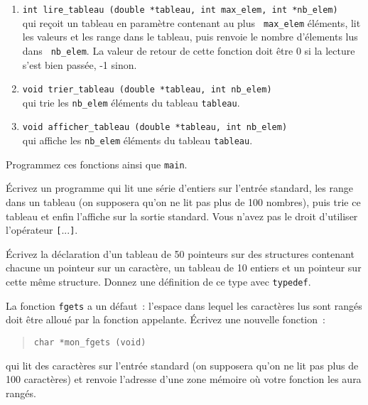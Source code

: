 \begin {enumerate}
    \item \verb|int lire_tableau (double *tableau, int max_elem, int *nb_elem)| \\
	qui reçoit un tableau en paramètre contenant au plus {\tt
	max\_elem} éléments, lit les valeurs et les range dans le
	tableau, puis renvoie le nombre d'élements lus dans {\tt
	nb\_elem}.  La valeur de retour de cette fonction doit être 0 si
	la lecture s'est bien passée, -1 sinon.


    \item \verb|void trier_tableau (double *tableau, int nb_elem)| \\
	qui trie les {\tt nb\_elem} éléments du tableau {\tt tableau}.

    \item \verb|void afficher_tableau (double *tableau, int nb_elem)| \\
	qui affiche les {\tt nb\_elem} éléments du tableau {\tt tableau}.

\end {enumerate}

Programmez ces fonctions ainsi que {\tt main}.


\question

Écrivez un programme qui lit une série d'entiers sur l'entrée
standard, les range dans un tableau (on supposera qu'on ne lit pas plus
de 100 nombres), puis trie ce tableau et enfin l'affiche sur la sortie
standard. Vous n'avez pas le droit d'utiliser l'opérateur {\tt[}...{\tt]}.



\question

Écrivez la déclaration d'un tableau de 50 pointeurs sur des structures
contenant chacune un pointeur sur un caractère, un tableau de 10
entiers et un pointeur sur cette même structure. Donnez une définition
de ce type avec {\tt typedef}.


\question

La fonction {\tt fgets} a un défaut~: l'espace dans lequel les caractères
lus sont rangés doit être alloué par la fonction appelante. Écrivez
une nouvelle fonction~:

\begin {quote}
    \verb|char *mon_fgets (void)|
\end {quote}

qui lit des caractères sur l'entrée standard
(on supposera qu'on ne lit pas plus de 100
caractères) et renvoie l'adresse d'une zone mémoire où votre
fonction les aura rangés.


